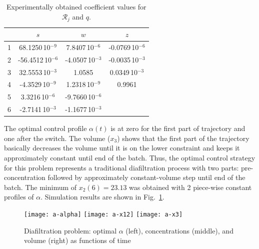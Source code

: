 \begin{table}
  \caption{Experimentally obtained coefficient values for $\mathcal{R}_j$ and $q$.}
  \label{tab:coefficients}
  \centering
  \begin{tabular}{lccc}
    & $s$ & $w$ & $z$ \\ \hline
1  &68.1250\,10$^{-9}$ &7.8407\,10$^{-6}$ &  -0.0769\,10$^{-6}$\\
2  &-56.4512\,10$^{-6}$ &-4.0507\,10$^{-3}$ & -0.0035\,10$^{-3}$ \\
3  & 32.5553\,10$^{-3}$& 1.0585&  0.0349\,10$^{-3}$\\
4  & -4.3529\,10$^{-9}$& 1.2318\,10$^{-9}$& 0.9961 \\
5  & 3.3216\,10$^{-6}$& -9.7660\,10$^{-6}$&  \\
6  & -2.7141\,10$^{-3}$& -1.1677\,10$^{-3}$&  \\
  \end{tabular}
\end{table}

The optimal control profile $\alpha(t)$ is at zero for the first part
of trajectory and one after the switch.  The volume ($x_3$) shows that
the first part of the trajectory basically decreases the volume until
it is on the lower constraint and keeps it approximately constant
until end of the batch. Thus, the optimal control strategy for this
problem represents a traditional diafiltration process with two parts:
pre-concentration followed by approximately constant-volume step until
end of the batch.  The minimum of $x_2(6) = 23.13$ was obtained with
2 piece-wise constant profiles of $\alpha$. Simulation results are
shown in Fig.~\ref{fig:problem-a}.

\begin{figure}[!h]
  \centering
  \texttt{[image: a-alpha]}
  \texttt{[image: a-x12]} 
  \texttt{[image: a-x3]}
  \caption{Diafiltration problem: optimal $\alpha$ (left),
    concentrations (middle), and volume (right) as functions of time}
  \label{fig:problem-a}
\end{figure}

